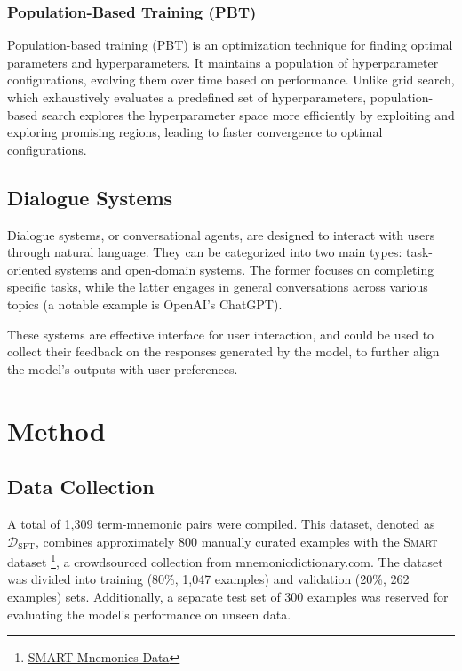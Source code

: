 \documentclass{article}
\newcounter{para}
\begin{document}
\subsubsection{Population-Based Training (PBT)} \label{sec:pbt}

Population-based training (PBT) is an optimization technique for finding optimal parameters and hyperparameters. It maintains a population of hyperparameter configurations, evolving them over time based on performance. Unlike grid search, which exhaustively evaluates a predefined set of hyperparameters, population-based search explores the hyperparameter space more efficiently by exploiting and exploring promising regions, leading to faster convergence to optimal configurations.

\subsection{Dialogue Systems} \label{sec:dialogue}

Dialogue systems, or conversational agents, are designed to interact with users through natural language. They can be categorized into two main types: task-oriented systems and open-domain systems. The former focuses on completing specific tasks, while the latter engages in general conversations across various topics (a notable example is OpenAI's ChatGPT).

These systems are effective interface for user interaction, and could be used to collect their feedback on the responses generated by the model, to further align the model's outputs with user preferences.

\section{Method} \label{sec:method}

\subsection{Data Collection} \label{sec:met-data}

A total of 1,309 term-mnemonic pairs were compiled. This dataset, denoted as \( \mathcal{D}_{\text{SFT}} \), combines approximately 800 manually curated examples with the \textsc{Smart} dataset \footnote{\href{https://huggingface.co/datasets/nbalepur/Mnemonic_SFT}{SMART Mnemonics Data}}, a crowdsourced collection from mnemonicdictionary.com. The dataset was divided into training (80\%, 1,047 examples) and validation (20\%, 262 examples) sets. Additionally, a separate test set of 300 examples was reserved for evaluating the model's performance on unseen data.
\end{document}

